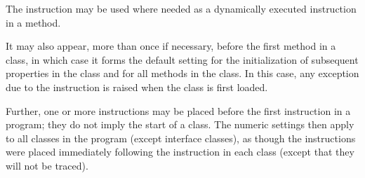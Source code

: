 The  instruction may be used where needed as a
dynamically executed instruction in a method.
 
It may also appear, more than once if necessary, before the first
method in a class, in which case it forms the default setting for the
initialization of subsequent properties in the class and for all methods
in the class.  In this case, any exception due to the 
instruction is raised when the class is first loaded.
 
Further, one or more  instructions may be placed
before the first  instruction in a program; they do
not imply the start of a class.  The numeric settings then apply
to all classes in the program (except interface classes), as
though the  instructions were placed immediately
following the  instruction in each class (except that
they will not be traced).
